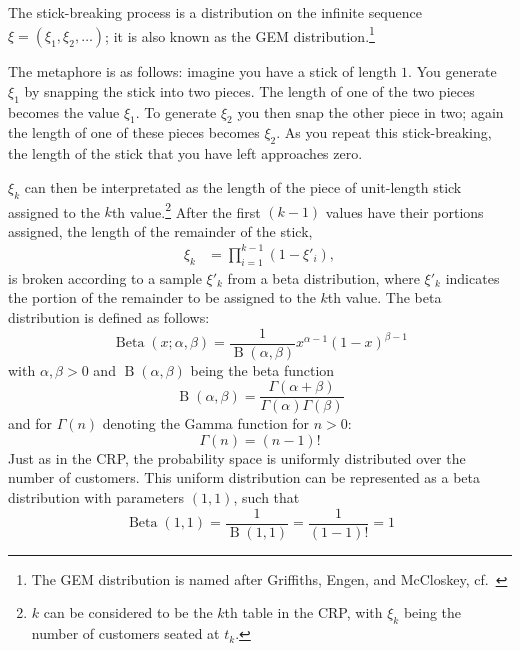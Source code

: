 The stick-breaking process\cite{Ishwaran2001Gibbs} is a distribution on the infinite sequence  $\xi = (\xi_1,\xi_2,\ldots)$; it is also known as the GEM distribution.\footnote{The GEM distribution is named after Griffiths, Engen, and McCloskey, cf.\ \cite{Pitman1997The}}

The metaphore is as follows: imagine you have a stick of length $1$. You generate $\xi_1$ by snapping the stick into two pieces. The length of one of the two pieces becomes the value $\xi_1$. To generate $\xi_2$ you then snap the other piece in two; again the length of one of these pieces becomes $\xi_2$. As you repeat this stick-breaking, the length of the stick that you have left approaches zero.

$\xi_k$ can then be interpretated as the length of the piece of unit-length stick assigned to the $k$th value.\footnote{$k$ can be considered to be the $k$th table in the CRP, with $\xi_k$ being the number of customers seated at $t_k$.} After the first $(k-1)$ values have their portions assigned, the length of the remainder of the stick, 
\begin{align}\label{eq:stickbreaking}
	\xi_k &= \prod_{i=1}^{k-1}(1-\xi'_i),
\end{align}
is broken according to a sample $\xi'_k$ from a beta distribution, where $\xi'_k$ indicates the portion of the remainder to be assigned to the $k$th value. The beta distribution is defined as follows:
\begin{equation} 
	\operatorname{Beta}(x; \alpha, \beta) = \frac{1}{\operatorname{B}(\alpha,\beta)}x^{\alpha-1}(1-x)^{\beta-1}\label{eq:betad}
\end{equation}
with $\alpha,\beta >0$ and $\operatorname{B}(\alpha,\beta)$ being the beta function
\begin{equation}
	\operatorname{B}(\alpha,\beta) = \frac{\Gamma(\alpha+\beta)}{\Gamma(\alpha)\Gamma(\beta)}\label{eq:betaf}
\end{equation}
and for $\Gamma(n)$ denoting the Gamma function for $n>0$:
\begin{equation}
	\Gamma(n) = (n-1)!\label{eq:gammaf}
\end{equation}
Just as in the CRP, the probability space is uniformly distributed over the number of customers. This uniform distribution can be represented as a beta distribution with parameters $(1,1)$, such that 
\begin{equation}
	\operatorname{Beta}(1,1)=\frac{1}{\operatorname{B}(1,1)} = \frac{1}{(1-1)!} = 1
\end{equation}

